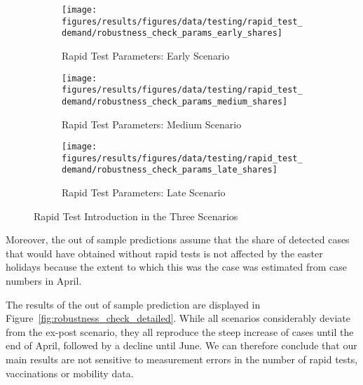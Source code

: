 \begin{figure}[ht] %
  \centering
  \begin{subfigure}[b]{0.3\textwidth}
    \texttt{[image: figures/results/figures/data/testing/rapid\_test\_demand/robustness\_check\_params\_early\_shares]}
    \caption{Rapid Test Parameters: Early Scenario}
    \label{fig:robustness_early_params}
  \end{subfigure}
  \hfill
  \begin{subfigure}[b]{0.3\textwidth}
    \texttt{[image: figures/results/figures/data/testing/rapid\_test\_demand/robustness\_check\_params\_medium\_shares]}
    \caption{Rapid Test Parameters: Medium Scenario}
    \label{fig:robustness_medium_params}
  \end{subfigure}
  \hfill
  \begin{subfigure}[b]{0.3\textwidth}
    \texttt{[image: figures/results/figures/data/testing/rapid\_test\_demand/robustness\_check\_params\_late\_shares]}
    \caption{Rapid Test Parameters: Late Scenario}
    \label{fig:robustness_late_params}
  \end{subfigure}

  \caption{Rapid Test Introduction in the Three Scenarios}
  \label{fig:robustness_check_rapid_test_params}

\end{figure}

Moreover, the out of sample predictions assume that the share of detected cases that
would have obtained without rapid tests is not affected by the easter holidays because
the extent to which this was the case was estimated from case numbers in April.

The results of the out of sample prediction are displayed in
Figure~\ref{fig:robustness_check_detailed}. While all scenarios considerably deviate from
the ex-post scenario, they all reproduce the steep increase of cases until the end
of April, followed by a decline until June. We can therefore conclude that our main
results are not sensitive to measurement errors in the number of rapid tests,
vaccinations or mobility data.



